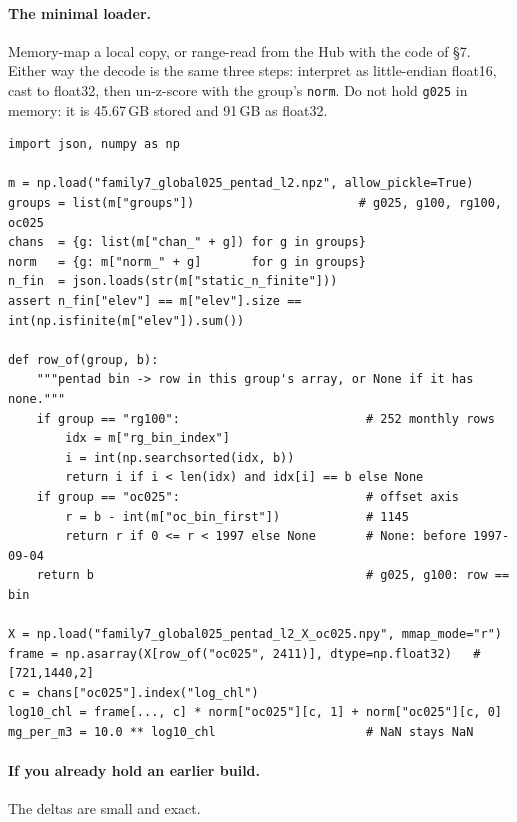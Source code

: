 \documentclass[10pt]{article}
\newcommand{\code}[1]{\texttt{#1}}
\begin{document}
\paragraph{The minimal loader.} Memory-map a local copy, or range-read from
the Hub with the code of \S7. Either way the decode is the same three steps:
interpret as little-endian float16, cast to float32, then un-z-score with the
group's \code{norm}. Do not hold \code{g025} in memory: it is 45.67\,GB
stored and 91\,GB as float32.

\begin{verbatim}
import json, numpy as np

m = np.load("family7_global025_pentad_l2.npz", allow_pickle=True)
groups = list(m["groups"])                       # g025, g100, rg100, oc025
chans  = {g: list(m["chan_" + g]) for g in groups}
norm   = {g: m["norm_" + g]       for g in groups}
n_fin  = json.loads(str(m["static_n_finite"]))
assert n_fin["elev"] == m["elev"].size == int(np.isfinite(m["elev"]).sum())

def row_of(group, b):
    """pentad bin -> row in this group's array, or None if it has none."""
    if group == "rg100":                          # 252 monthly rows
        idx = m["rg_bin_index"]
        i = int(np.searchsorted(idx, b))
        return i if i < len(idx) and idx[i] == b else None
    if group == "oc025":                          # offset axis
        r = b - int(m["oc_bin_first"])            # 1145
        return r if 0 <= r < 1997 else None       # None: before 1997-09-04
    return b                                      # g025, g100: row == bin

X = np.load("family7_global025_pentad_l2_X_oc025.npy", mmap_mode="r")
frame = np.asarray(X[row_of("oc025", 2411)], dtype=np.float32)   # [721,1440,2]
c = chans["oc025"].index("log_chl")
log10_chl = frame[..., c] * norm["oc025"][c, 1] + norm["oc025"][c, 0]
mg_per_m3 = 10.0 ** log10_chl                     # NaN stays NaN
\end{verbatim}

\paragraph{If you already hold an earlier build.} The deltas are small and
exact.
\end{document}
